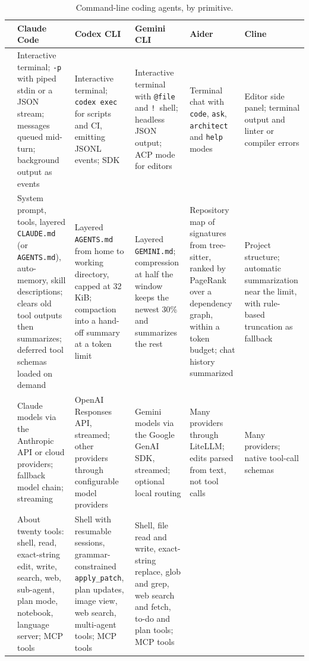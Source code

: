 \begin{table}[p]
\centering
\scriptsize
\setlength{\tabcolsep}{3pt}
\renewcommand{\arraystretch}{1.15}
\caption{Command-line coding agents, by primitive.}
\label{tab:cli}
\begin{tabularx}{\linewidth}{@{}>{\bfseries}p{1.95cm}YYYYY@{}}
\toprule
& Claude Code & Codex CLI & Gemini CLI & Aider & Cline \\
\midrule
{} &
Interactive terminal; \texttt{-p} with piped stdin or a JSON stream; messages queued mid-turn; background output as events &
Interactive terminal; \texttt{codex exec} for scripts and CI, emitting JSONL events; SDK &
Interactive terminal with \texttt{@file} and \texttt{!}~shell; headless JSON output; ACP mode for editors &
Terminal chat with \texttt{code}, \texttt{ask}, \texttt{architect} and \texttt{help} modes &
Editor side panel; terminal output and linter or compiler errors \\
\addlinespace
{} &
System prompt, tools, layered \texttt{CLAUDE.md} (or \texttt{AGENTS.md}), auto-memory, skill descriptions; clears old tool outputs then summarizes; deferred tool schemas loaded on demand &
Layered \texttt{AGENTS.md} from home to working directory, capped at 32\,KiB; compaction into a hand-off summary at a token limit &
Layered \texttt{GEMINI.md}; compression at half the window keeps the newest 30\% and summarizes the rest &
Repository map of signatures from tree-sitter, ranked by PageRank over a dependency graph, within a token budget; chat history summarized &
Project structure; automatic summarization near the limit, with rule-based truncation as fallback \\
\addlinespace
{}\newline{} &
Claude models via the Anthropic API or cloud providers; fallback model chain; streaming &
OpenAI Responses API, streamed; other providers through configurable model providers &
Gemini models via the Google GenAI SDK, streamed; optional local routing &
Many providers through LiteLLM; edits parsed from text, not tool calls &
Many providers; native tool-call schemas \\
\addlinespace
{} &
About twenty tools: shell, read, exact-string edit, write, search, web, sub-agent, plan mode, notebook, language server; MCP tools &
Shell with resumable sessions, grammar-constrained \texttt{apply\_patch}, plan updates, image view, web search, multi-agent tools; MCP tools &
Shell, file read and write, exact-string replace, glob and grep, web search and fetch, to-do and plan tools; MCP tools &

\end{tabularx}
\end{table}
